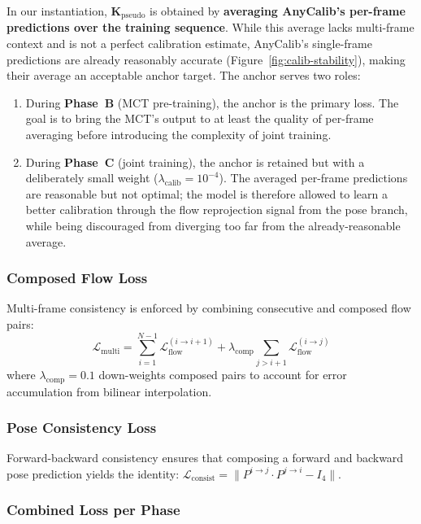 In our instantiation, $\mathbf{K}_\text{pseudo}$ is obtained by \textbf{averaging AnyCalib's per-frame predictions over the training sequence}. While this average lacks multi-frame context and is not a perfect calibration estimate, AnyCalib's single-frame predictions are already reasonably accurate (Figure~\ref{fig:calib-stability}), making their average an acceptable anchor target. The anchor serves two roles:
\begin{enumerate}
    \item During \textbf{Phase~B} (MCT pre-training), the anchor is the primary loss. The goal is to bring the MCT's output to at least the quality of per-frame averaging before introducing the complexity of joint training.
    \item During \textbf{Phase~C} (joint training), the anchor is retained but with a deliberately small weight ($\lambda_\text{calib} = 10^{-4}$). The averaged per-frame predictions are reasonable but not optimal; the model is therefore allowed to learn a better calibration through the flow reprojection signal from the pose branch, while being discouraged from diverging too far from the already-reasonable average.
\end{enumerate}

\subsubsection{Composed Flow Loss}

Multi-frame consistency is enforced by combining consecutive and composed flow pairs:
\begin{equation}
    \mathcal{L}_{\text{multi}} = \sum_{i=1}^{N-1} \mathcal{L}_{\text{flow}}^{(i \to i+1)} + \lambda_{\text{comp}} \sum_{j>i+1} \mathcal{L}_{\text{flow}}^{(i \to j)}
\end{equation}
where $\lambda_{\text{comp}} = 0.1$ down-weights composed pairs to account for error accumulation from bilinear interpolation.

\subsubsection{Pose Consistency Loss}

Forward-backward consistency ensures that composing a forward and backward pose prediction yields the identity: $\mathcal{L}_\text{consist} = \|P^{i \to j} \cdot P^{j \to i} - I_4\|$.

\subsubsection{Combined Loss per Phase}

